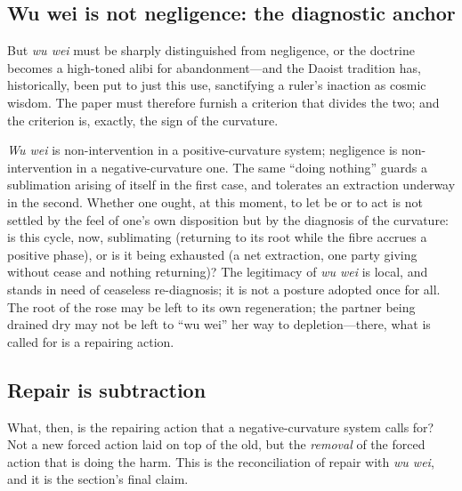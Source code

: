 \subsection{Wu wei is not negligence: the diagnostic anchor}
\label{p09:sec:not-negligence}

But \emph{wu wei} must be sharply distinguished from negligence, or the doctrine becomes a high-toned alibi for abandonment---and the Daoist tradition has, historically, been put to just this use, sanctifying a ruler's inaction as cosmic wisdom. The paper must therefore furnish a criterion that divides the two; and the criterion is, exactly, the sign of the curvature.

\begin{claim}
\emph{Wu wei} is non-intervention in a positive-curvature system; negligence is non-intervention in a negative-curvature one. The same ``doing nothing'' guards a sublimation arising of itself in the first case, and tolerates an extraction underway in the second. Whether one ought, at this moment, to let be or to act is not settled by the feel of one's own disposition but by the diagnosis of the curvature: is this cycle, now, sublimating (returning to its root while the fibre accrues a positive phase), or is it being exhausted (a net extraction, one party giving without cease and nothing returning)? The legitimacy of \emph{wu wei} is local, and stands in need of ceaseless re-diagnosis; it is not a posture adopted once for all. The root of the rose may be left to its own regeneration; the partner being drained dry may not be left to ``wu wei'' her way to depletion---there, what is called for is a repairing action.
\end{claim}

\subsection{Repair is subtraction}
\label{p09:sec:repair}

What, then, is the repairing action that a negative-curvature system calls for? Not a new forced action laid on top of the old, but the \emph{removal} of the forced action that is doing the harm. This is the reconciliation of repair with \emph{wu wei}, and it is the section's final claim.


